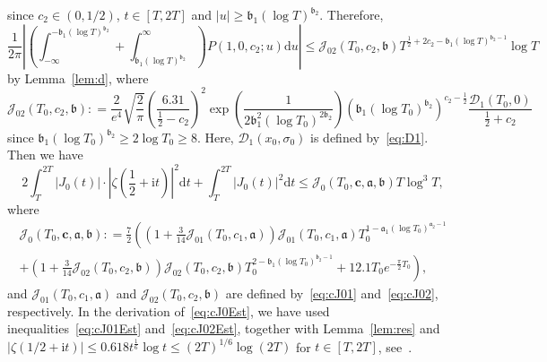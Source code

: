\documentclass[a4paper,reqno]{amsart}
\theoremstyle{definition}
\newcommand{\de}[0]{\mathrel{\mathop:}=}
\newcommand{\ie}[0]{\mathrm{i}}
\newcommand{\dif}[1]{\mathrm{d}#1}
\begin{document}
since $c_2\in(0,1/2)$, $t\in[T,2T]$ and $|u|\geq \mathfrak{b}_1\left(\log{T}\right)^{\mathfrak{b}_{2}}$. Therefore,
\begin{equation}
\label{eq:cJ02Est}
\frac{1}{2\pi}\left|\left(\int_{-\infty}^{-\mathfrak{b}_1\left(\log{T}\right)^{\mathfrak{b}_2}}+\int_{\mathfrak{b}_1\left(\log{T}\right)^{\mathfrak{b}_2}}^{\infty}\right)P(1,0,c_2;u)\dif{u}\right| \leq \mathcal{J}_{02}\left(T_0,c_2,\bm{\mathfrak{b}}\right)T^{\frac{1}{2}+2c_2-\mathfrak{b}_1\left(\log{T}\right)^{\mathfrak{b}_{2}-1}}\log{T}
\end{equation}
by Lemma~\ref{lem:d}, where
\begin{equation}
\label{eq:cJ02}
\mathcal{J}_{02}\left(T_0,c_2,\bm{\mathfrak{b}}\right)\de \frac{2}{e^4}\sqrt{\frac{2}{\pi}}\left(\frac{6.31}{\frac{1}{2}-c_2}\right)^{2}\exp{\left(\frac{1}{2\mathfrak{b}_1^2\left(\log{T_0}\right)^{2\mathfrak{b}_2}}\right)} \left(\mathfrak{b}_1\left(\log{T_0}\right)^{\mathfrak{b}_{2}}\right)^{c_2-\frac{1}{2}}\frac{\mathcal{D}_1(T_0,0)}{\frac{1}{2}+c_2}
\end{equation}
since $\mathfrak{b}_1\left(\log{T_0}\right)^{\mathfrak{b}_{2}}\geq 2\log{T_0}\geq 8$. Here, $\mathcal{D}_{1}(x_0,\sigma_0)$ is defined by~\eqref{eq:D1}. Then we have
\begin{equation}
\label{eq:cJ0Est}    
2\int_{T}^{2T}\left|J_0(t)\right|\cdot\left|\zeta\left(\frac{1}{2}+\ie t\right)\right|^{2}\dif{t} + \int_{T}^{2T}\left|J_0(t)\right|^{2}\dif{t} \leq \mathcal{J}_0\left(T_0,\bm{c},\bm{\mathfrak{a}},\bm{\mathfrak{b}}\right)T\log^{3}{T},
\end{equation}
where
\begin{multline}
\label{eq:cJ0}
\mathcal{J}_0\left(T_0,\bm{c},\bm{\mathfrak{a}},\bm{\mathfrak{b}}\right) \de \frac{7}{2}\left(\left(1+\frac{3}{14}\mathcal{J}_{01}\left(T_0,c_1,\bm{\mathfrak{a}}\right)\right)\mathcal{J}_{01}\left(T_0,c_1,\bm{\mathfrak{a}}\right) T_0^{1-\mathfrak{a}_1(\log{T_0})^{\mathfrak{a}_{2}-1}}\right. \\
\left.+\left(1+\frac{3}{14}\mathcal{J}_{02}\left(T_0,c_2,\bm{\mathfrak{b}}\right)\right)\mathcal{J}_{02}\left(T_0,c_2,\bm{\mathfrak{b}}\right) T_0^{2-\mathfrak{b}_1(\log{T_0})^{\mathfrak{b}_{2}-1}}+12.1T_0 e^{-\frac{\pi}{2}T_0}\right),
\end{multline}
and $\mathcal{J}_{01}\left(T_0,c_1,\bm{\mathfrak{a}}\right)$ and $\mathcal{J}_{02}\left(T_0,c_2,\bm{\mathfrak{b}}\right)$ are defined by~\eqref{eq:cJ01} and~\eqref{eq:cJ02}, respectively. In the derivation of~\eqref{eq:cJ0Est}, we have used inequalities~\eqref{eq:cJ01Est} and~\eqref{eq:cJ02Est}, together with Lemma~\ref{lem:res} and $\left|\zeta(1/2+\ie t)\right|\leq  0.618 t^{\frac{1}{6}} \log t\leq (2T)^{1/6}\log{(2T)}$ for $t\in[T,2T]$, see~\cite[Theorem~1.1]{HiaryPatelYang}.
\end{document}

